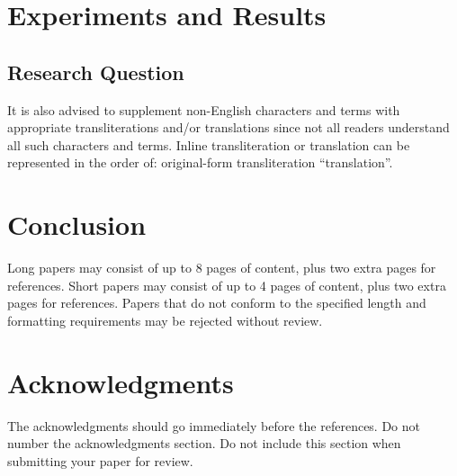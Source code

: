 \documentclass[11pt,a4paper]{article}
\begin{document}
\section{Experiments and Results}

\subsection{Research Question}

It is also advised to supplement non-English characters and terms
with appropriate transliterations and/or translations
since not all readers understand all such characters and terms.
Inline transliteration or translation can be represented in
the order of: original-form transliteration ``translation''.

\section{Conclusion}
\label{sec:length}

Long papers may consist of up to 8 pages of content, plus two extra
pages for references. Short papers may consist of up to 4 pages of
content, plus two extra pages for references.  Papers that do not
conform to the specified length and formatting requirements may be
rejected without review.



\section*{Acknowledgments}

The acknowledgments should go immediately before the references.  Do
not number the acknowledgments section. Do not include this section
when submitting your paper for review.

%
%
\end{document}
